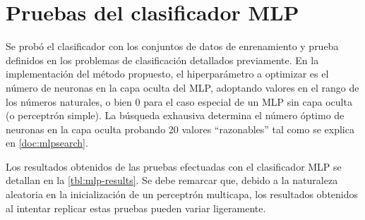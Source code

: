 \section{Pruebas del clasificador MLP}
Se probó el clasificador con los conjuntos de datos de enrenamiento y
prueba definidos en los problemas de clasificación detallados
previamente. En la implementación del método propuesto, el
hiperparámetro a optimizar es el número de neuronas en la capa oculta
del MLP, adoptando valores en el rango de los números naturales, o
bien 0 para el caso especial de un MLP sin capa oculta (o perceptrón
simple). La búsqueda exhausiva determina el número óptimo de neuronas
en la capa oculta probando 20 valores ``razonables'' tal como se
explica en \autoref{doc:mlpsearch}.

Los resultados obtenidos de las pruebas efectuadas con el clasificador
MLP se detallan en la \autoref{tbl:mlp-results}. Se debe remarcar que,
debido a la naturaleza aleatoria en la inicialización de un perceptrón
multicapa, los resultados obtenidos al intentar replicar estas pruebas
pueden variar ligeramente.
